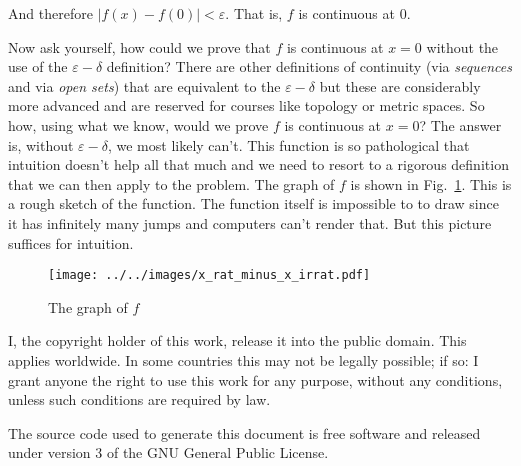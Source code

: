 \documentclass{article}
\theoremstyle{normal}
\begin{document}
    And therefore $|f(x)-f(0)|<\varepsilon$. That is, $f$ is continuous at 0.
    \par\hfill\par
    Now ask yourself, how could we prove that $f$ is continuous at $x=0$
    without the use of the $\varepsilon-\delta$ definition? There are other
    definitions of continuity (via \textit{sequences} and via
    \textit{open sets}) that are equivalent to the $\varepsilon-\delta$ but
    these are considerably more advanced and are reserved for courses like
    topology or metric spaces. So how, using what we know, would we
    prove $f$ is continuous at $x=0$? The answer is, without
    $\varepsilon-\delta$, we most likely can't. This function is so pathological
    that intuition doesn't help all that much and we need to resort to a
    rigorous definition that we can then apply to the problem. The graph
    of $f$ is shown in Fig.~\ref{fig:graph_of_f}. This is a rough sketch of
    the function. The function itself is impossible to to draw since it has
    infinitely many jumps and computers can't render that. But this picture
    suffices for intuition.
    \begin{figure}
        \centering
        \texttt{[image: ../../images/x\_rat\_minus\_x\_irrat.pdf]}
        \caption{The graph of $f$}
        \label{fig:graph_of_f}
    \end{figure}
    \newpage
    I, the copyright holder of this work, release it into the public domain.
    This applies worldwide. In some countries this may not be legally possible;
    if so: I grant anyone the right to use this work for any purpose, without
    any conditions, unless such conditions are required by law.
    \par\hfill\par
    The source code used to generate this document is free software and released
    under version 3 of the GNU General Public License.
\end{document}
